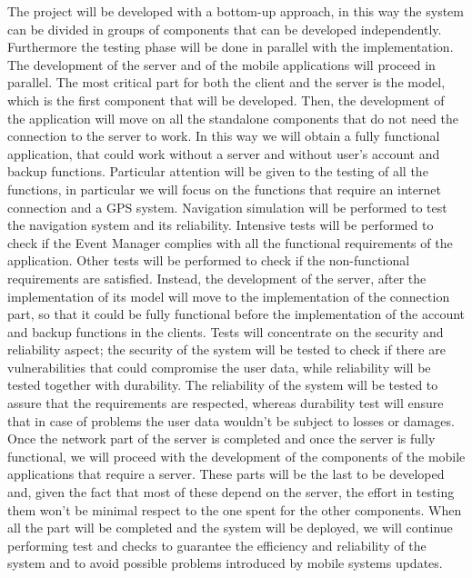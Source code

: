 The project will be developed with a bottom-up approach, in this way the system can be divided in groups of components that can be developed independently. 
Furthermore the testing phase will be done in parallel with the implementation.
The development of the server and of the mobile applications will proceed in parallel.
The most critical part for both the client and the server is the model, which is the first component that will be developed.
Then, the development of the application will move on all the standalone components that do not need the connection to the server to work.
In this way we will obtain a fully functional application, that could work without a server and without user’s account and backup functions.
Particular attention will be given to the testing of all the functions, in particular we will focus on the functions that require an internet connection and a GPS system.
Navigation simulation will be performed to test the navigation system and its reliability.
Intensive tests will be performed to check if the Event Manager complies with all the functional requirements of the application.
Other tests will be performed to check if the non-functional requirements are satisfied.
Instead, the development of the server, after the implementation of its model will move to the implementation of the connection part, so that it could be fully functional before the implementation of the account and backup functions in the clients.
Tests will concentrate on the security and reliability aspect; the security of the system will be tested to check if there are vulnerabilities that could compromise the user data, while reliability will be tested together with durability.
The reliability of the system will be tested to assure that the requirements are respected, whereas durability test will ensure that in case of problems the user data wouldn’t be subject to losses or damages.
Once the network part of the server is completed and once the server is fully functional, we will proceed with the development of the components of the mobile applications that require a server.
These parts will be the last to be developed and, given the fact that most of these depend on the server, the effort in testing them won’t be minimal respect to the one spent for the other components.
When all the part will be completed and the system will be deployed, we will continue performing test and checks to guarantee the efficiency and reliability of the system and to avoid possible problems introduced by mobile systems updates.

